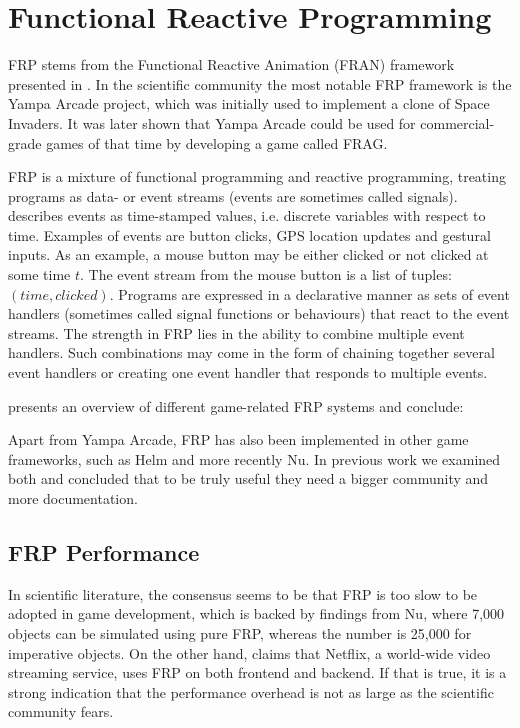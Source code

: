 \section{Functional Reactive Programming}\label{sec:frp}
\gls{FRP} stems from the Functional Reactive Animation (FRAN) framework presented in \cite{ElliottHudak97:Fran}. In the scientific community the most notable \gls{FRP} framework is the Yampa Arcade project\cite{courtney2003yampa}, which was initially used to implement a clone of Space Invaders. It was later shown that Yampa Arcade could be used for commercial-grade games of that time by developing a game called FRAG\cite{cheong2005functional}.

\gls{FRP} is a mixture of functional programming and reactive programming, treating programs as data- or event streams (events are sometimes called signals). \cite{lettier:frp} describes events as time-stamped values, i.e. discrete variables with respect to time. Examples of events are button clicks, GPS location updates and gestural inputs\cite{singh:frp}. As an example, a mouse button may be either clicked or not clicked at some time $t$. The event stream from the mouse button is a list of tuples: $(time,clicked)$. Programs are expressed in a declarative manner as sets of event handlers (sometimes called signal functions or behaviours) that react to the event streams. The strength in \gls{FRP} lies in the ability to combine multiple event handlers. Such combinations may come in the form of chaining together several event handlers or creating one event handler that responds to multiple events\cite{lettier:frp}.

\cite{maraffi:frp} presents an overview of different game-related \gls{FRP} systems and conclude:

Apart from Yampa Arcade, \gls{FRP} has also been implemented in other game frameworks, such as Helm \cite{helm:wiki} and more recently Nu\cite{nu:github}. In previous work we examined both and concluded that to be truly useful they need a bigger community and more documentation\cite{p92018gameplay}.

\subsection{FRP Performance}
In scientific literature, the consensus seems to be that \gls{FRP} is too slow to be adopted in game development\cite{maraffi:frp,cheong2005functional}, which is backed by findings from Nu, where 7,000 objects can be simulated using pure \gls{FRP}, whereas the number is 25,000 for imperative objects\cite{edds2016whyFunctional}. On the other hand, \cite{rey:frp} claims that Netflix, a world-wide video streaming service, uses \gls{FRP} on both frontend and backend. If that is true, it is a strong indication that the performance overhead is not as large as the scientific community fears.

